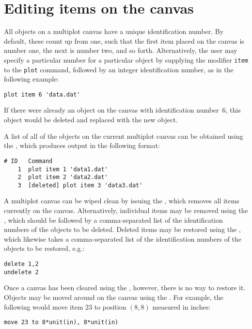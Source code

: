 
\section{Editing items on the canvas}

All objects on a multiplot canvas have a unique identification number.  By
default, these count up from one, such that the first item placed on the canvas
is number one, the next is number two, and so forth. Alternatively, the user
may specify a particular number for a particular object by supplying the
modifier {\tt item} to the {\tt plot} command, followed by an integer
identification number, as in the following example:
\begin{verbatim}
plot item 6 'data.dat'
\end{verbatim}
If there were already an object on the canvas with identification number~6,
this object would be deleted and replaced with the new object.

A list of all of the objects on the current multiplot canvas can be obtained
using the , which produces output in the following format:
\begin{verbatim}
# ID   Command
    1  plot item 1 'data1.dat'
    2  plot item 2 'data2.dat'
    3  [deleted] plot item 3 'data3.dat'
\end{verbatim}

A multiplot canvas can be wiped clean by issuing the , which
removes all items currently on the canvas. Alternatively, individual items may
be removed using the , which should be followed by a
comma-separated list of the identification numbers of the objects to be
deleted.  Deleted items may be restored using the , which
likewise takes a comma-separated list of the identification numbers of the
objects to be restored, e.g.:
\begin{verbatim}
delete 1,2
undelete 2
\end{verbatim}
Once a canvas has been cleared using the , however, there is no
way to restore it.  Objects may be moved around on the canvas using the
. For example, the following would move item 23 to position
$(8,8)$ measured in inches:
\begin{verbatim}
move 23 to 8*unit(in), 8*unit(in)
\end{verbatim}

